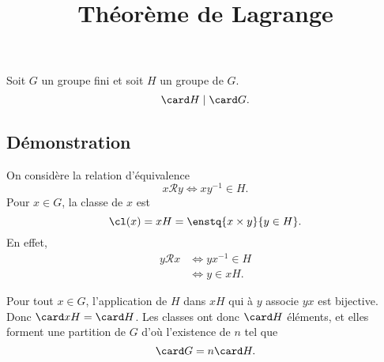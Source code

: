 \documentclass[fontsize=12pt,twoside=false,parskip=half, french]{scrartcl}
\title{Théorème de Lagrange}
\date{}
\author{}
\begin{document}
\maketitle
   \begin{Theoreme}
      Soit $G$ un groupe fini et soit $H$ un groupe de $G$.
      \[
         \card H \mid \card G.
      \]
   \end{Theoreme}
   \subsection{Démonstration}
      On considère la relation d’équivalence
      \[
         x \mathcal{R} y \iff xy^{-1} \in H. 
      \]
      Pour $x \in G$, la classe de $x$ est
      \[
         \cl(x) = xH = \enstq{x \times y}{y \in H}.
      \]
      En effet,
      \begin{align*}
         y \mathcal{R} x &\iff yx^{-1} \in H\\
                         &\iff y \in xH.
      \end{align*}
      
      Pour tout $x \in G$, l’application de $H$ dans $xH$ qui à $y$ associe $yx$ est bijective.
      Donc $\card xH = \card H$. Les classes ont donc $\card H$ éléments, et elles forment une 
      partition de $G$ d’où l’existence de $n$ tel que
      \[
         \card G = n \card H.
      \]  
\end{document}
